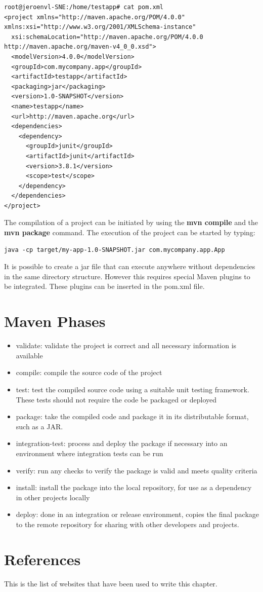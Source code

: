 \begin{verbatim}
root@jeroenvl-SNE:/home/testapp# cat pom.xml 
<project xmlns="http://maven.apache.org/POM/4.0.0" xmlns:xsi="http://www.w3.org/2001/XMLSchema-instance"
  xsi:schemaLocation="http://maven.apache.org/POM/4.0.0 http://maven.apache.org/maven-v4_0_0.xsd">
  <modelVersion>4.0.0</modelVersion>
  <groupId>com.mycompany.app</groupId>
  <artifactId>testapp</artifactId>
  <packaging>jar</packaging>
  <version>1.0-SNAPSHOT</version>
  <name>testapp</name>
  <url>http://maven.apache.org</url>
  <dependencies>
    <dependency>
      <groupId>junit</groupId>
      <artifactId>junit</artifactId>
      <version>3.8.1</version>
      <scope>test</scope>
    </dependency>
  </dependencies>
</project>
\end{verbatim}

The compilation of a project can be initiated by using the \textbf{mvn compile} and the \textbf{mvn package} command.
The execution of the project can be started by typing:

\begin{verbatim}
java -cp target/my-app-1.0-SNAPSHOT.jar com.mycompany.app.App 
\end{verbatim}

It is possible to create a jar file that can execute anywhere without dependencies in the same directory structure. However this requires special Maven plugins to be integrated. These plugins can be inserted in the pom.xml file.\newpage 

\section{Maven Phases}

\begin{itemize}
	\item validate: validate the project is correct and all necessary information is available
	\item compile: compile the source code of the project
	\item test: test the compiled source code using a suitable unit testing framework. These tests should not require the code be packaged or deployed
	\item package: take the compiled code and package it in its distributable format, such as a JAR.
	\item integration-test: process and deploy the package if necessary into an environment where integration tests can be run
	\item verify: run any checks to verify the package is valid and meets quality criteria
	\item install: install the package into the local repository, for use as a dependency in other projects locally
	\item deploy: done in an integration or release environment, copies the final package to the remote repository for sharing with other developers and projects.
\end{itemize}
\newpage
\section{References}
This is the list of websites that have been used to write this chapter.


